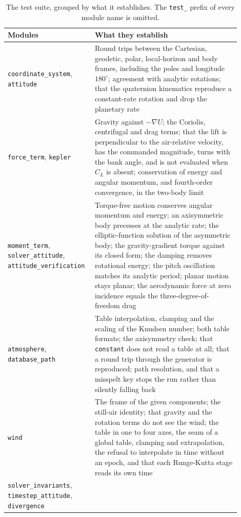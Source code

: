 \documentclass[11pt,a4paper]{article}
\begin{document}
\begin{table}[h]
\caption{The test suite, grouped by what it establishes. The \texttt{test\_} prefix of every module name is omitted.}
\label{test_modules}
\begin{center}
\small
\begin{tabular}{>{\raggedright\arraybackslash}p{0.30\linewidth}|>{\raggedright\arraybackslash}p{0.60\linewidth}}
\hline \hline
Modules & What they establish \\
\hline
\texttt{coordinate\_system}, \texttt{attitude} &
Round trips between the Cartesian, geodetic, polar, local-horizon and body frames,
including the poles and longitude $180^\circ$; agreement with analytic rotations; that the
quaternion kinematics reproduce a constant-rate rotation and drop the planetary rate \\
\texttt{force\_term}, \texttt{kepler} &
Gravity against $-\nabla U$; the Coriolis, centrifugal and drag terms; that the lift is
perpendicular to the air-relative velocity, has the commanded magnitude, turns with the
bank angle, and is not evaluated when $C_L$ is absent; conservation of energy and angular
momentum, and fourth-order convergence, in the two-body limit \\
\texttt{moment\_term}, \texttt{solver\_attitude}, \texttt{attitude\_verification} &
Torque-free motion conserves angular momentum and energy; an axisymmetric body precesses
at the analytic rate; the elliptic-function solution of the asymmetric body; the
gravity-gradient torque against its closed form; the damping removes rotational energy;
the pitch oscillation matches its analytic period; planar motion stays planar; the
aerodynamic force at zero incidence equals the three-degree-of-freedom drag \\
\texttt{atmosphere}, \texttt{database\_path} &
Table interpolation, clamping and the scaling of the Knudsen number; both table formats;
the axisymmetry check; that \texttt{constant} does not read a table at all; that a
round trip through the generator is reproduced; path resolution, and that a misspelt key
stops the run rather than silently falling back \\
\texttt{wind} &
The frame of the given components; the still-air identity; that gravity and the rotation
terms do not see the wind; the table in one to four axes, the seam of a global table,
clamping and extrapolation, the refusal to interpolate in time without an epoch, and that
each Runge-Kutta stage reads its own time \\
\texttt{solver\_invariants}, \texttt{timestep\_attitude}, \texttt{divergence} &

\end{tabular}
\end{center}
\end{table}
\end{document}
